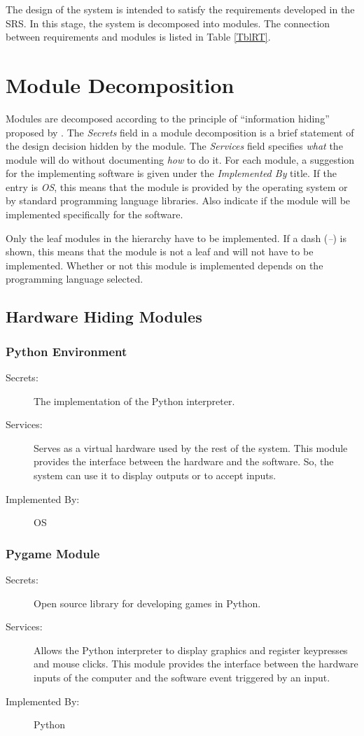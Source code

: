 \documentclass[12pt, titlepage]{article}
\begin{document}
The design of the system is intended to satisfy the requirements developed in
the SRS. In this stage, the system is decomposed into modules. The connection
between requirements and modules is listed in Table \ref{TblRT}.

\section{Module Decomposition} \label{SecMD}

Modules are decomposed according to the principle of ``information hiding''
proposed by \citet{ParnasEtAl1984}. The \emph{Secrets} field in a module
decomposition is a brief statement of the design decision hidden by the
module. The \emph{Services} field specifies \emph{what} the module will do
without documenting \emph{how} to do it. For each module, a suggestion for the
implementing software is given under the \emph{Implemented By} title. If the
entry is \emph{OS}, this means that the module is provided by the operating
system or by standard programming language libraries.  Also indicate if the
module will be implemented specifically for the software.

Only the leaf modules in the
hierarchy have to be implemented. If a dash (\emph{--}) is shown, this means
that the module is not a leaf and will not have to be implemented. Whether or
not this module is implemented depends on the programming language
selected.

\subsection{Hardware Hiding Modules}

\subsubsection{Python Environment}
\begin{description}
\item[Secrets:]The implementation of the Python interpreter.
\item[Services:]Serves as a virtual hardware used by the rest of the
  system. This module provides the interface between the hardware and the
  software. So, the system can use it to display outputs or to accept inputs.
\item[Implemented By:] OS
\end{description}

\subsubsection{Pygame Module}
\begin{description}
\item[Secrets:]Open source library for developing games in Python.
\item[Services:]Allows the Python interpreter to display graphics and register keypresses
    and mouse clicks. This module provides the interface between the hardware inputs of the
    computer and the software event triggered by an input.
\item[Implemented By:] Python
\end{description}
\end{document}
